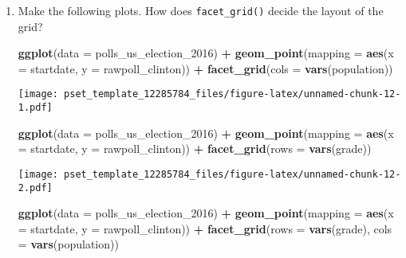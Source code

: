 \documentclass[
]{article}
\newenvironment{Shaded}{\begin{snugshade}}{\end{snugshade}}
\newcommand{\DataTypeTok}[1]{\textcolor[rgb]{0.13,0.29,0.53}{#1}}
\newcommand{\DecValTok}[1]{\textcolor[rgb]{0.00,0.00,0.81}{#1}}
\newcommand{\KeywordTok}[1]{\textcolor[rgb]{0.13,0.29,0.53}{\textbf{#1}}}
\newcommand{\NormalTok}[1]{#1}
\newcommand{\OperatorTok}[1]{\textcolor[rgb]{0.81,0.36,0.00}{\textbf{#1}}}
\newcommand{\StringTok}[1]{\textcolor[rgb]{0.31,0.60,0.02}{#1}}
\begin{document}
\begin{enumerate}
\def\labelenumi{\arabic{enumi}.}
\item
  Make the following plots. How does \texttt{facet\_grid()} decide the
  layout of the grid?

\begin{Shaded}
\begin{Highlighting}[]
\KeywordTok{ggplot}\NormalTok{(}\DataTypeTok{data =}\NormalTok{ polls_us_election_}\DecValTok{2016}\NormalTok{) }\OperatorTok{+}\StringTok{ }
\StringTok{  }\KeywordTok{geom_point}\NormalTok{(}\DataTypeTok{mapping =} \KeywordTok{aes}\NormalTok{(}\DataTypeTok{x =}\NormalTok{ startdate, }
                           \DataTypeTok{y =}\NormalTok{ rawpoll_clinton)) }\OperatorTok{+}
\StringTok{  }\KeywordTok{facet_grid}\NormalTok{(}\DataTypeTok{cols =} \KeywordTok{vars}\NormalTok{(population))}
\end{Highlighting}
\end{Shaded}

  \texttt{[image: pset\_template\_12285784\_files/figure-latex/unnamed-chunk-12-1.pdf]}

\begin{Shaded}
\begin{Highlighting}[]
\KeywordTok{ggplot}\NormalTok{(}\DataTypeTok{data =}\NormalTok{ polls_us_election_}\DecValTok{2016}\NormalTok{) }\OperatorTok{+}\StringTok{ }
\StringTok{  }\KeywordTok{geom_point}\NormalTok{(}\DataTypeTok{mapping =} \KeywordTok{aes}\NormalTok{(}\DataTypeTok{x =}\NormalTok{ startdate, }
                           \DataTypeTok{y =}\NormalTok{ rawpoll_clinton)) }\OperatorTok{+}
\StringTok{  }\KeywordTok{facet_grid}\NormalTok{(}\DataTypeTok{rows =} \KeywordTok{vars}\NormalTok{(grade))}
\end{Highlighting}
\end{Shaded}

  \texttt{[image: pset\_template\_12285784\_files/figure-latex/unnamed-chunk-12-2.pdf]}

\begin{Shaded}
\begin{Highlighting}[]
\KeywordTok{ggplot}\NormalTok{(}\DataTypeTok{data =}\NormalTok{ polls_us_election_}\DecValTok{2016}\NormalTok{) }\OperatorTok{+}\StringTok{ }
\StringTok{  }\KeywordTok{geom_point}\NormalTok{(}\DataTypeTok{mapping =} \KeywordTok{aes}\NormalTok{(}\DataTypeTok{x =}\NormalTok{ startdate, }
                           \DataTypeTok{y =}\NormalTok{ rawpoll_clinton)) }\OperatorTok{+}
\StringTok{  }\KeywordTok{facet_grid}\NormalTok{(}\DataTypeTok{rows =} \KeywordTok{vars}\NormalTok{(grade), }\DataTypeTok{cols =} \KeywordTok{vars}\NormalTok{(population))}
\end{Highlighting}
\end{Shaded}


\end{enumerate}
\end{document}
